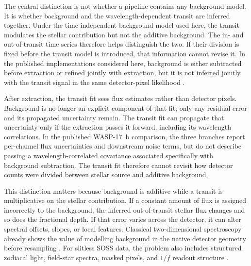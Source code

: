 The central distinction is not whether a pipeline contains any background
model. It is whether background and the wavelength-dependent transit are
inferred together. Under the time-independent-background model used here, the
transit modulates the stellar contribution but not the additive background.
The in- and out-of-transit time series therefore helps distinguish the two. If
their division is fixed before the transit model is introduced, that
information cannot revise it. In the published implementations considered
here, background is either subtracted before extraction or refined jointly
with extraction, but it is not inferred jointly with the transit signal in the
same detector-pixel likelihood
\citep{HolmbergMadhusudhan2023,LouieEtAl2025}.

After extraction, the transit fit sees flux estimates rather than detector
pixels. Background is no longer an explicit component of that fit; only any
residual error and its propagated uncertainty remain. The transit fit can
propagate that uncertainty only if the extraction passes it forward, including
its wavelength correlations. In the published WASP-17~b comparison, the three
branches report per-channel flux uncertainties and downstream noise terms, but
do not describe passing a wavelength-correlated covariance associated
specifically with background subtraction. The transit fit therefore cannot
revisit how detector counts were divided between stellar source and additive
background.

This distinction matters because background is additive while a transit is
multiplicative on the stellar contribution. If a constant amount of flux is
assigned incorrectly to the background, the inferred out-of-transit stellar
flux changes and so does the fractional depth. If that error varies across the
detector, it can alter spectral offsets, slopes, or local features. Classical
two-dimensional spectroscopy already shows the value of modelling background
in the native detector geometry before resampling
\citep{Kelson2003}. For slitless SOSS data, the problem also includes structured
zodiacal light, field-star spectra, masked pixels, and $1/f$ readout structure
\citep{RadicaEtAl2023,HolmbergMadhusudhan2023}.

